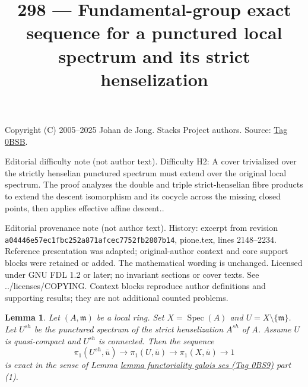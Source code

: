 \documentclass{amsart}
\theoremstyle{plain}
\newtheorem{lemma}[subsection]{Lemma}
\theoremstyle{definition}
\theoremstyle{remark}
\numberwithin{equation}{subsection}
\def\Spec{\mathop{\mathrm{Spec}}}
\begin{document}
\title[Stacks Project, Tag 0BSB]{298 --- Fundamental-group exact sequence for a punctured local spectrum and its strict henselization}
\maketitle
\noindent Copyright (C) 2005--2025 Johan de Jong. Stacks Project authors. Source: \href{https://stacks.math.columbia.edu/tag/0BSB}{Tag 0BSB}.

\noindent Editorial difficulty note (not author text). Difficulty H2: A cover trivialized over the strictly henselian punctured spectrum must extend over the original local spectrum. The proof analyzes the double and triple strict-henselian fibre products to extend the descent isomorphism and its cocycle across the missing closed points, then applies effective affine descent..

\noindent Editorial provenance note (not author text). History: excerpt from revision \texttt{a0444\allowbreak 6e57e\allowbreak c1fbc\allowbreak 252a8\allowbreak 71afc\allowbreak ec775\allowbreak 2fb28\allowbreak 07b14}, pione.tex, lines 2148--2234. Reference presentation was adapted; original-author context and core support blocks were retained or added. The mathematical wording is unchanged. Licensed under GNU FDL 1.2 or later; no invariant sections or cover texts. See ../licenses/COPYING. Context blocks reproduce author definitions and supporting results; they are not additional counted problems.

\begin{lemma}
\label{lemma-local-exact-sequence}
Let $(A, \mathfrak m)$ be a local ring. Set $X = \Spec(A)$ and
$U = X \setminus \{\mathfrak m\}$. Let $U^{sh}$ be the punctured spectrum
of the strict henselization $A^{sh}$ of $A$.
Assume $U$ is quasi-compact and $U^{sh}$ is connected. Then the sequence
$$
\pi_1(U^{sh}, \overline{u}) \to \pi_1(U, \overline{u}) \to
\pi_1(X, \overline{u}) \to 1
$$
is exact in the sense of Lemma \href{https://stacks.math.columbia.edu/tag/0BS9}{lemma functoriality galois ses (Tag 0BS9)} part (1).
\end{lemma}
\end{document}
